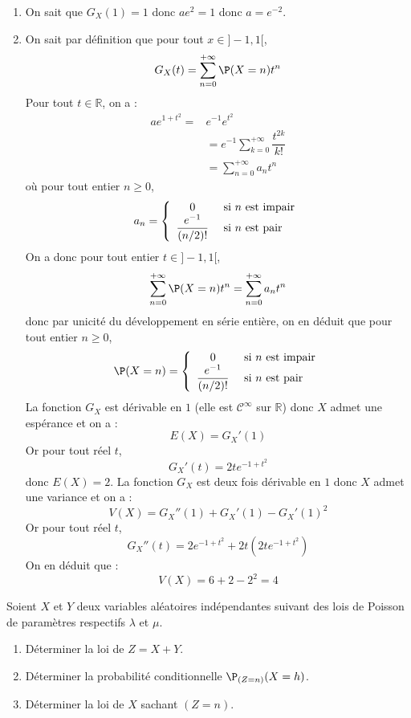 \documentclass[a4paper,10pt]{report}
\begin{document}
\corr 

\begin{enumerate}
\item On sait que $G_X(1)=1$ donc $ae^2=1$ donc $a= e^{-2}$.
\item On sait par définition que pour tout $x \in ]-1,1[$,
$$ G_X(t) = \sum_{n=0}^{+ \infty}  \P(X=n) t^n $$
Pour tout $t \in \mathbb{R}$, on a :
\begin{align*}
ae^{1+t^2} = & e^{-1} e^{t^2} \\
& = e^{-1} \sum_{k=0}^{+ \infty} \dfrac{t^{2k}}{k!} \\
& = \sum_{n=0}^{+ \infty} a_n t^n
\end{align*}
où pour tout entier $n \geq 0$,
$$ a_n = \left\lbrace \begin{array}{cl}
0 & \hbox{ si } n \hbox{ est impair} \\
\dfrac{e^{-1}}{(n/2)!} & \hbox{ si } n \hbox{ est pair} \\
\end{array}\right.$$
On a donc pour tout entier $t \in ]-1,1[$,
$$ \sum_{n=0}^{+ \infty}  \P(X=n) t^n= \sum_{n=0}^{+ \infty} a_n t^n $$
donc par unicité du développement en série entière, on en déduit que pour tout entier $n \geq 0$,
$$  \P(X=n) = \left\lbrace \begin{array}{cl}
0 & \hbox{ si } n \hbox{ est impair} \\
\dfrac{e^{-1}}{(n/2)!} & \hbox{ si } n \hbox{ est pair} \\
\end{array}\right.$$
La fonction $G_X$ est dérivable en $1$ (elle est $\mathcal{C}^{\infty}$ sur $\mathbb{R}$) donc $X$ admet une espérance et on a :
$$ E(X)= G_X'(1)$$
Or pour tout réel $t$,
$$ G_X'(t) = 2t e^{-1+t^2}$$
donc $E(X)= 2$. La fonction $G_X$ est deux fois dérivable en $1$ donc $X$ admet une variance et on a :
$$ V(X) = G_X''(1)+G_X'(1)-G_X'(1)^2$$
Or pour tout réel $t$,
$$ G_X''(t) = 2e^{-1+t^2} + 2t (2t e^{-1+t^2})$$
On en déduit que :
$$ V(X) = 6+ 2-2^2=4$$
\end{enumerate}


\begin{Exa}
Soient $X$ et $Y$ deux variables aléatoires indépendantes suivant des lois de Poisson de paramètres respectifs $\lambda$ et $\mu$.
\begin{enumerate}
\item Déterminer la loi de $Z=X+Y$.
\item Déterminer la probabilité conditionnelle $\P_{(Z=n)}(X=h)$.
\item Déterminer la loi de $X$ sachant $(Z=n)$.
\end{enumerate}
\end{Exa}
\end{document}
